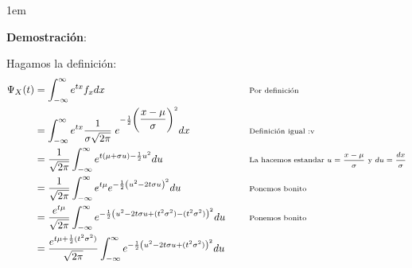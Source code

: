 \documentclass[12pt, fleqn]{report}                             %
\newenvironment{SmallIndentation}[1][0.75em]                    %
        {\begin{adjustwidth}{#1}{}\begin{footnotesize}}             %
        {\end{footnotesize}\end{adjustwidth}}                       %
\DeclareMathOperator \Space {\quad}                             %
\newcommand \Remember[1]{\Space\text{\scriptsize{#1}}}          %
\theoremstyle{break}                                            %
\newcommand{\Wrap}[1]{\left( #1 \right)}                        %
\newcommand{\pfrac}[2]{\Wrap{\dfrac{#1}{#2}}}                   %
\begin{document}
                \begin{SmallIndentation}[1em]
                    \textbf{Demostración}:
                    
                    Hagamos la definición:
                    \begin{align*}
                        \Psi_X(t) 
                            &= \int_{-\infty}^\infty e^{tx} f_x dx                                  
                                && \Remember{Por definición}                                        \\
                            &= \int_{-\infty}^\infty e^{tx} 
                                    \dfrac{1}{\sigma \sqrt{2\pi}} \; 
                                        e^{-\frac{1}{2}\pfrac{x - \mu}{\sigma}^2} dx               
                                && \Remember{Definición igual :v}                                   \\
                            &= \dfrac{1}{\sqrt{2\pi}}
                                    \int_{-\infty}^\infty 
                                        e^{t(\mu + \sigma u) - \frac{1}{2}u^2} du
                                && \Remember{La hacemos estandar 
                                    $u=\dfrac{x-\mu}{\sigma}$ y $du=\dfrac{dx}{\sigma}$}            \\
                            &= \dfrac{1}{\sqrt{2\pi}}
                                    \int_{-\infty}^\infty 
                                        e^{t\mu}
                                        e^{-\frac{1}{2} \Wrap{u^2 -2t\sigma u}^2} du
                                && \Remember{Ponemos bonito}                                        \\
                            &= \dfrac{e^{t\mu}}{\sqrt{2\pi}}
                                    \int_{-\infty}^\infty 
                                        e^{-\frac{1}{2} 
                                            \Wrap{u^2 -2t\sigma u + (t^2\sigma^2) - (t^2\sigma^2)}^2
                                        } du
                                && \Remember{Ponemos bonito}                                        \\
                            &= \dfrac{e^{t\mu + \frac{1}{2}(t^2\sigma^2)}}{\sqrt{2\pi}}
                                    \int_{-\infty}^\infty 
                                        e^{-\frac{1}{2} 
                                            \Wrap{u^2 -2t\sigma u + (t^2\sigma^2)}^2
                                        } du

\end{align*}
\end{SmallIndentation}
\end{document}
